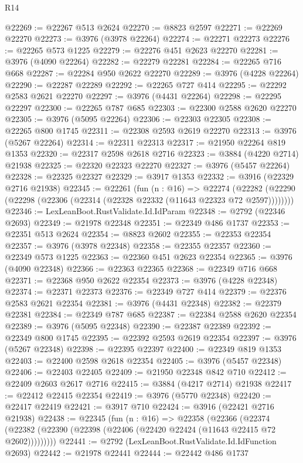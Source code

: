 \begin{lexlean}{R14}
\begin{coremodule}
@22269 := @22267 @513 @2624
@22270 := @8823 @2597
@22271 := @22269 @22270
@22273 := @3976 (@3978 @22264)
@22274 := @22271 @22273
@22276 := @22265 @573 @1225
@22279 := @22276 @451 @2623 @22270
@22281 := @3976 (@4090 @22264)
@22282 := @22279 @22281
@22284 := @22265 @716 @668
@22287 := @22284 @950 @2622 @22270
@22289 := @3976 (@4228 @22264)
@22290 := @22287 @22289
@22292 := @22265 @727 @414
@22295 := @22292 @2583 @2621 @22270
@22297 := @3976 (@4431 @22264)
@22298 := @22295 @22297
@22300 := @22265 @787 @685
@22303 := @22300 @2588 @2620 @22270
@22305 := @3976 (@5095 @22264)
@22306 := @22303 @22305
@22308 := @22265 @800 @1745
@22311 := @22308 @2593 @2619 @22270
@22313 := @3976 (@5267 @22264)
@22314 := @22311 @22313
@22317 := @21950 @22264 @819 @1353
@22320 := @22317 @2598 @2618 @2716
@22323 := @3884 (@4220 @2714) @21938
@22325 := @22320 @22323 @22270
@22327 := @3976 (@5457 @22264)
@22328 := @22325 @22327
@22329 := @3917 @1353
@22332 := @3916 (@22329 @2716 @21938)
@22345 := @22261
    (fun (n : @16) =>
    @22274 (@22282 (@22290 (@22298 (@22306 (@22314 (@22328 @22332 (@11643 @22323 @72 @2597))))))))
@22346 := LexLeanBoot.RustValidate.Id.IdParam
@22348 := @2792 (@22346 @2693)
@22349 := @21978 @22348
@22351 := @22349 @486 @1737
@22353 := @22351 @513 @2624
@22354 := @8823 @2602
@22355 := @22353 @22354
@22357 := @3976 (@3978 @22348)
@22358 := @22355 @22357
@22360 := @22349 @573 @1225
@22363 := @22360 @451 @2623 @22354
@22365 := @3976 (@4090 @22348)
@22366 := @22363 @22365
@22368 := @22349 @716 @668
@22371 := @22368 @950 @2622 @22354
@22373 := @3976 (@4228 @22348)
@22374 := @22371 @22373
@22376 := @22349 @727 @414
@22379 := @22376 @2583 @2621 @22354
@22381 := @3976 (@4431 @22348)
@22382 := @22379 @22381
@22384 := @22349 @787 @685
@22387 := @22384 @2588 @2620 @22354
@22389 := @3976 (@5095 @22348)
@22390 := @22387 @22389
@22392 := @22349 @800 @1745
@22395 := @22392 @2593 @2619 @22354
@22397 := @3976 (@5267 @22348)
@22398 := @22395 @22397
@22400 := @22349 @819 @1353
@22403 := @22400 @2598 @2618 @22354
@22405 := @3976 (@5457 @22348)
@22406 := @22403 @22405
@22409 := @21950 @22348 @842 @710
@22412 := @22409 @2603 @2617 @2716
@22415 := @3884 (@4217 @2714) @21938
@22417 := @22412 @22415 @22354
@22419 := @3976 (@5770 @22348)
@22420 := @22417 @22419
@22421 := @3917 @710
@22424 := @3916 (@22421 @2716 @21938)
@22438 := @22345
    (fun (n : @16) =>
    @22358
      (@22366
        (@22374 (@22382 (@22390 (@22398 (@22406 (@22420 @22424 (@11643 @22415 @72 @2602)))))))))
@22441 := @2792 (LexLeanBoot.RustValidate.Id.IdFunction @2693)
@22442 := @21978 @22441
@22444 := @22442 @486 @1737

\end{coremodule}
\end{lexlean}
